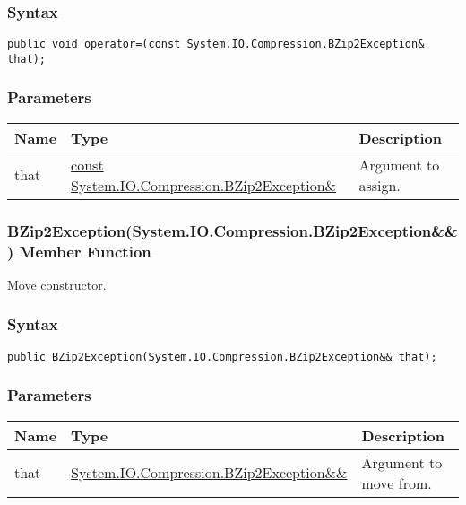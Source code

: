 \documentclass[a4paper,oneside,11.000000pt]{book}
\begin{document}
\subsubsection*{Syntax}
\texttt{public void operator=(const System.IO.Compression.BZip2Exception\& that);}
\subsubsection*{Parameters}
\begin{flushleft}
\begin{supertabular}[l]{!{\raggedright}p{1.30721cm}!{\raggedright}p{8.55945cm}!{\raggedright}p{4.89046cm}}
\textbf{Name}
& \textbf{Type}
& \textbf{Description}
\\
\hline
that
& \hyperlink{System.IO.Compression.BZip2Exception}{const System.\-IO.\-Compression.\-BZip2Exception\&\-}
& Argument to assign.

\\
\end{supertabular}

\end{flushleft}
\clearpage

\hypertarget{System.IO.Compression.BZip2Exception.constructor.P.System.IO.Compression.BZip2Exception.RR.System.IO.Compression.BZip2Exception}{\subsubsection*{BZip2Exception(System.IO.Compression.BZip2Exception\&\&) Member Function}}\begin{flushleft}
Move constructor.

\end{flushleft}
\subsubsection*{Syntax}
\texttt{public BZip2Exception(System.IO.Compression.BZip2Exception\&\& that);}
\subsubsection*{Parameters}
\begin{flushleft}
\begin{supertabular}[l]{!{\raggedright}p{1.30721cm}!{\raggedright}p{8.55945cm}!{\raggedright}p{4.93333cm}}
\textbf{Name}
& \textbf{Type}
& \textbf{Description}
\\
\hline
that
& \hyperlink{System.IO.Compression.BZip2Exception}{System.\-IO.\-Compression.\-BZip2Exception\&\-\&\-}
& Argument to move from.

\\
\end{supertabular}

\end{flushleft}
\clearpage
\end{document}
